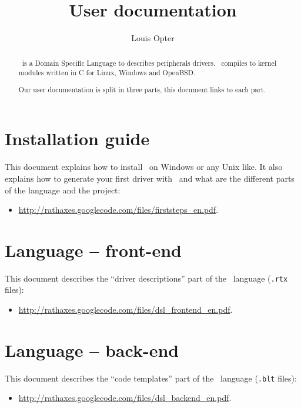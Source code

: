\documentclass[american]{rtxarticle}
\title{User documentation}
\author{Louis Opter}
\begin{document}
\maketitle

\begin{abstract}
\rtx\ is a Domain Specific Language to describes peripherals drivers. \rtx\
compiles to kernel modules written in C for Linux, Windows and OpenBSD.

Our user documentation is split in three parts, this document links
to each part.
\end{abstract}

\section*{Installation guide}

This document explains how to install \rtx\ on Windows or any Unix like. It
also explains how to generate your first driver with \rtx\ and what are the
different parts of the language and the project:
\begin{itemize}
\item {\small\url{http://rathaxes.googlecode.com/files/firststeps_en.pdf}}.
\end{itemize}

\section*{Language -- front-end}

This document describes the ``driver descriptions'' part of the \rtx\ language
(\texttt{.rtx} files):
\begin{itemize}
\item {\small\url{http://rathaxes.googlecode.com/files/dsl_frontend_en.pdf}}.
\end{itemize}

\section*{Language -- back-end}

This document describes the ``code templates'' part of the \rtx\ language
(\texttt{.blt} files):
\begin{itemize}
\item {\small\url{http://rathaxes.googlecode.com/files/dsl_backend_en.pdf}}.
\end{itemize}

\rtxmaketitleblock
\end{document}
